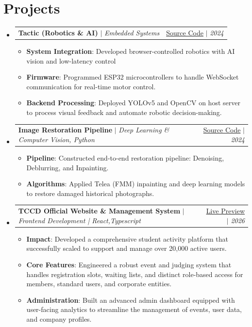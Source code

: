 \documentclass[letterpaper,11pt]{article}
\makeatletter
\newcommand{\resumeItem}[2]{\item\small{\textbf{#1}{: #2 \vspace{-2pt}}}}
\newcommand{\resumeProjectSubheading}[3]{
  \vspace{-1pt}\item
    \begin{tabular*}{0.97\textwidth}{l@{\extracolsep{\fill}}r}
      \textbf{#1} $|$ \textit{\small#2} & #3 \\
    \end{tabular*}\vspace{-5pt}
}
\newcommand{\resumeSubHeadingListStart}{\begin{itemize}[leftmargin=*]}
\newcommand{\resumeSubHeadingListEnd}{\end{itemize}}
\newcommand{\resumeItemListStart}{\begin{itemize}}
\newcommand{\resumeItemListEnd}{\end{itemize}\vspace{-5pt}}
\makeatother
\begin{document}
\section{Projects}
  \resumeSubHeadingListStart
    \resumeProjectSubheading
      {Tactic (Robotics \& AI)}{Embedded Systems}{\href{https://github.com/roboSobia}{Source Code} $|$ \textit{\small 2024}}
      \resumeItemListStart
        \resumeItem{System Integration}
          {Developed browser-controlled robotics with AI vision and low-latency control}
        \resumeItem{Firmware}
          {Programmed ESP32 microcontrollers to handle WebSocket communication for real-time motor control.}
        \resumeItem{Backend Processing}
          {Deployed YOLOv5 and OpenCV on host server to process visual feedback and automate robotic decision-making.}
      \resumeItemListEnd
    \vspace{4pt}
    \resumeProjectSubheading
      {Image Restoration Pipeline}{Deep Learning \& Computer Vision, Python}{\href{https://github.com/ahmedfathy0-0/Image-Colorization-of-Historical-Photos}{Source Code} $|$ \textit{\small 2024}}
      \resumeItemListStart
        \resumeItem{Pipeline}
          {Constructed end-to-end restoration pipeline: Denoising, Deblurring, and Inpainting.}
        \resumeItem{Algorithms}
          {Applied Telea (FMM) inpainting and deep learning models to restore damaged historical photographs.}
      \resumeItemListEnd
    \vspace{4pt}
    \resumeProjectSubheading
      {TCCD Official Website \& Management System}{Frontend Development | React,Typescript}{\href{https://tccd.eng.cu.edu.eg/}{Live Preview} $|$ \textit{\small 2026}}
      \resumeItemListStart
        \resumeItem{Impact}
          {Developed a comprehensive student activity platform that successfully scaled to support and manage over 20,000 active users.}
        \resumeItem{Core Features}
          {Engineered a robust event and judging system that handles registration slots, waiting lists, and distinct role-based access for members, standard users, and corporate entities.}
        \resumeItem{Administration}
          {Built an advanced admin dashboard equipped with user-facing analytics to streamline the management of events, user data, and company profiles.}
      \resumeItemListEnd
  \resumeSubHeadingListEnd
\end{document}
